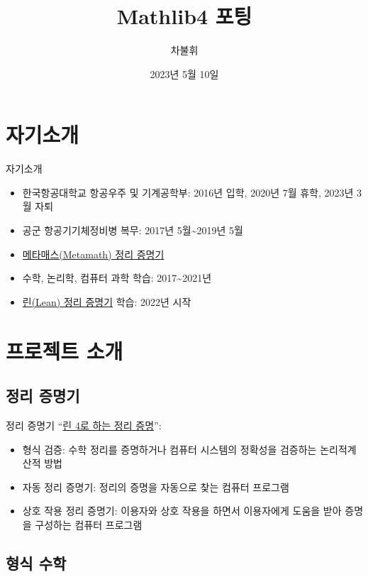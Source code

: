 \documentclass{beamer}
\title{Mathlib4 포팅}
\author{차불휘}
\date{2023년 5월 10일}
\begin{document}
\frame{\titlepage}

\section{자기소개}

\begin{frame}{자기소개}
  \begin{itemize}
    \item 한국항공대학교 항공우주 및 기계공학부: 2016년 입학, 2020년 7월 휴학, 2023년
          3월 자퇴
    \item 공군 항공기기체정비병 복무: 2017년 5월\textasciitilde2019년 5월
    \item \href{https://us.metamath.org/index.html}{메타매스(Metamath) 정리
          증명기}
    \item 수학, 논리학, 컴퓨터 과학 학습: 2017\textasciitilde2021년
    \item \href{https://leanprover.github.io/}{린(Lean) 정리 증명기} 학습: 2022년
          시작
  \end{itemize}
\end{frame}

\section{프로젝트 소개}

\subsection{정리 증명기}

\begin{frame}{정리 증명기}
  \textquotedblleft \href{https://leanprover.github.io/theorem_proving_in_lean4/introduction.html}
  {린 4로 하는 정리 증명}\textquotedblright \autocite{tpil4}:
  \begin{itemize}
    \item 형식 검증: 수학 정리를 증명하거나 컴퓨터 시스템의 정확성을 검증하는
          논리적\textperiodcentered 계산적 방법
    \item 자동 정리 증명기: 정리의 증명을 자동으로 찾는 컴퓨터 프로그램
    \item 상호 작용 정리 증명기: 이용자와 상호 작용을 하면서 이용자에게 도움을
          받아 증명을 구성하는 컴퓨터 프로그램
  \end{itemize}
\end{frame}

\subsection{형식 수학}
\end{document}

